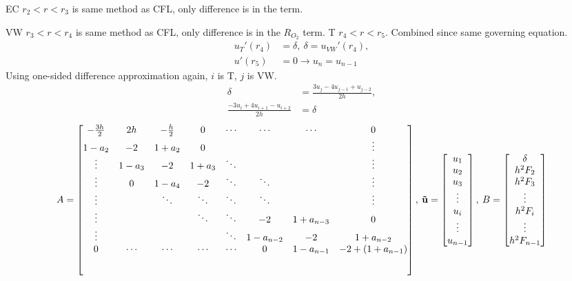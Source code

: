 \documentclass[8pt, a4paper]{article}
\begin{document}
  EC $r_2<r<r_3$ is same method as CFL, only difference is in the \RNO term.
  
  VW $r_3<r<r_4$ is same method as CFL, only difference is in the $R_{O_2}$ 
  term.
  \newpage
  T $r_4<r<r_5$. Combined since same governing equation.
    \begin{align*}
    u_{T}'(r_4)&=\delta,\:\delta=u_{VW}'(r_4),\\    
    u'(r_5)&=0\rightarrow u_n=u_{n-1}
    \end{align*}
  Using one-sided difference approximation again, $i$ is T, $j$ is VW.
  \begin{align*}
  \delta&=\frac{3u_j-4u_{j-1}+u_{j-2}}{2h},\\
  \frac{-3u_i+4u_{i+1}-u_{i+2}}{2h}&=\delta
  \end{align*}
  \begin{equation}
  A=
  \begin{bmatrix}
  -\frac{3h}{2} & 2h & -\frac{h}{2} & 0 & \cdots & \cdots & \cdots & 0\\
  1-a_2 & -2 & 1+a_2 & 0 & & & & \vdots\\
  \vdots & 1-a_3 & -2 & 1+a_3 & \ddots & & & \vdots\\
  \vdots & 0 & 1-a_4 & -2 & \ddots & \ddots & & \vdots\\
  \vdots & & \ddots & \ddots & \ddots & \ddots & & \vdots\\
  \vdots & & & \ddots & \ddots & -2 & 1+a_{n-3} & 0 \\
  \vdots & & & & \ddots & 1-a_{n-2} & -2 & 1+a_{n-2} \\
  0 & \cdots & \cdots & \cdots & \cdots & 0 & 1-a_{n-1} & -2+(1+a_{n-1}) \\[5ex]
  \end{bmatrix},\:
  \mathbf{\vec{u}}=
  \begin{bmatrix}
  u_1\\
  u_2\\
  u_3\\
  \vdots\\
  u_i\\
  \vdots\\
  u_{n-1}
  \end{bmatrix},\:
  B=
  \begin{bmatrix}
  \delta\\
  h^2F_2\\
  h^2F_3\\
  \vdots\\
  h^2F_i\\
  \vdots\\
  h^2F_{n-1}
  \end{bmatrix}
  \end{equation}
\end{document}
